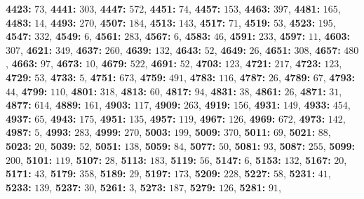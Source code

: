 \textsf{\bfseries 4423:} $73$, \textsf{\bfseries 4441:} $303$, \textsf{\bfseries 4447:} $572$, \textsf{\bfseries 4451:} $74$, \textsf{\bfseries 4457:} $153$, \textsf{\bfseries 4463:} $397$, \textsf{\bfseries 4481:} $165$, \textsf{\bfseries 4483:} $14$, \textsf{\bfseries 4493:} $270$, \textsf{\bfseries 4507:} $184$, \textsf{\bfseries 4513:} $143$, \textsf{\bfseries 4517:} $71$, \textsf{\bfseries 4519:} $53$, \textsf{\bfseries 4523:} $195$, \textsf{\bfseries 4547:} $332$, \textsf{\bfseries 4549:} $6$, \textsf{\bfseries 4561:} $283$, \textsf{\bfseries 4567:} $6$, \textsf{\bfseries 4583:} $46$, \textsf{\bfseries 4591:} $233$, \textsf{\bfseries 4597:} $11$, \textsf{\bfseries 4603:} $307$, \textsf{\bfseries 4621:} $349$, \textsf{\bfseries 4637:} $260$, \textsf{\bfseries 4639:} $132$, \textsf{\bfseries 4643:} $52$, \textsf{\bfseries 4649:} $26$, \textsf{\bfseries 4651:} $308$, \textsf{\bfseries 4657:} $480$, \textsf{\bfseries 4663:} $97$, \textsf{\bfseries 4673:} $10$, \textsf{\bfseries 4679:} $522$, \textsf{\bfseries 4691:} $52$, \textsf{\bfseries 4703:} $123$, \textsf{\bfseries 4721:} $217$, \textsf{\bfseries 4723:} $123$, \textsf{\bfseries 4729:} $53$, \textsf{\bfseries 4733:} $5$, \textsf{\bfseries 4751:} $673$, \textsf{\bfseries 4759:} $491$, \textsf{\bfseries 4783:} $116$, \textsf{\bfseries 4787:} $26$, \textsf{\bfseries 4789:} $67$, \textsf{\bfseries 4793:} $44$, \textsf{\bfseries 4799:} $110$, \textsf{\bfseries 4801:} $318$, \textsf{\bfseries 4813:} $60$, \textsf{\bfseries 4817:} $94$, \textsf{\bfseries 4831:} $38$, \textsf{\bfseries 4861:} $26$, \textsf{\bfseries 4871:} $31$, \textsf{\bfseries 4877:} $614$, \textsf{\bfseries 4889:} $161$, \textsf{\bfseries 4903:} $117$, \textsf{\bfseries 4909:} $263$, \textsf{\bfseries 4919:} $156$, \textsf{\bfseries 4931:} $149$, \textsf{\bfseries 4933:} $454$, \textsf{\bfseries 4937:} $65$, \textsf{\bfseries 4943:} $175$, \textsf{\bfseries 4951:} $135$, \textsf{\bfseries 4957:} $119$, \textsf{\bfseries 4967:} $126$, \textsf{\bfseries 4969:} $672$, \textsf{\bfseries 4973:} $142$, \textsf{\bfseries 4987:} $5$, \textsf{\bfseries 4993:} $283$, \textsf{\bfseries 4999:} $270$, \textsf{\bfseries 5003:} $199$, \textsf{\bfseries 5009:} $370$, \textsf{\bfseries 5011:} $69$, \textsf{\bfseries 5021:} $88$, \textsf{\bfseries 5023:} $20$, \textsf{\bfseries 5039:} $52$, \textsf{\bfseries 5051:} $138$, \textsf{\bfseries 5059:} $84$, \textsf{\bfseries 5077:} $50$, \textsf{\bfseries 5081:} $93$, \textsf{\bfseries 5087:} $255$, \textsf{\bfseries 5099:} $200$, \textsf{\bfseries 5101:} $119$, \textsf{\bfseries 5107:} $28$, \textsf{\bfseries 5113:} $183$, \textsf{\bfseries 5119:} $56$, \textsf{\bfseries 5147:} $6$, \textsf{\bfseries 5153:} $132$, \textsf{\bfseries 5167:} $20$, \textsf{\bfseries 5171:} $43$, \textsf{\bfseries 5179:} $358$, \textsf{\bfseries 5189:} $29$, \textsf{\bfseries 5197:} $173$, \textsf{\bfseries 5209:} $228$, \textsf{\bfseries 5227:} $58$, \textsf{\bfseries 5231:} $41$, \textsf{\bfseries 5233:} $139$, \textsf{\bfseries 5237:} $30$, \textsf{\bfseries 5261:} $3$, \textsf{\bfseries 5273:} $187$, \textsf{\bfseries 5279:} $126$, \textsf{\bfseries 5281:} $91$, 
